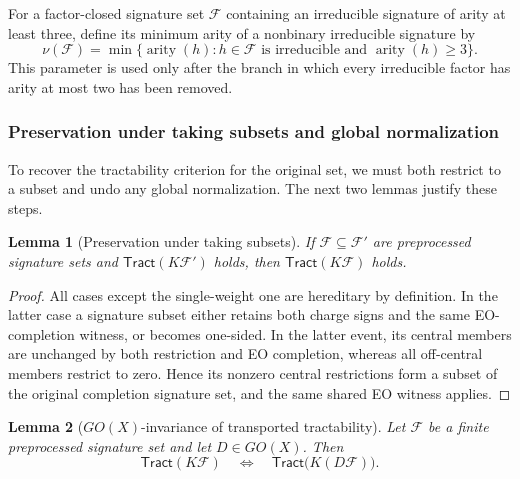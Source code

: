 \documentclass[11pt,letterpaper,onecolumn]{article}
\theoremstyle{plain}
\newtheorem{lemma}[lemma]{Lemma}
\theoremstyle{definition}
\theoremstyle{remark}
\newcommand{\cF}{\mathcal F}
\newcommand{\Tract}{\mathsf{Tract}}
\newcommand{\arity}{\operatorname{arity}}
\begin{document}
For a factor-closed signature set \(\cF\) containing an irreducible
signature of arity at least three, define its minimum arity of a nonbinary irreducible signature by
\begin{equation*}
 \nu(\cF)
 =\min\{\arity(h):h\in\cF
          \text{ is irreducible and }\arity(h)\ge3\}.
\end{equation*}
This parameter is used only after the branch in which every irreducible factor has
arity at most two has been removed.

\subsubsection{Preservation under taking subsets and global normalization}

To recover the tractability criterion for the original set, we must both
restrict to a subset and undo any global normalization. The next two
lemmas justify these steps.

\begin{lemma}[Preservation under taking subsets]
\label{lem:downward-inheritance}
If \(\cF\subseteq\cF'\) are preprocessed signature sets and
\(\Tract(K\cF')\) holds, then \(\Tract(K\cF)\) holds.
\end{lemma}

\begin{proof}
All cases except the single-weight one are hereditary by definition.
In the latter case a signature subset either retains both charge signs and the
same EO-completion witness, or becomes one-sided.  In the latter event, its
central members are unchanged by both restriction and EO completion, whereas
all off-central members restrict to zero.  Hence its nonzero central
restrictions form a subset of the original completion signature set, and the
same shared EO witness applies.
\end{proof}

\begin{lemma}[\(GO(X)\)-invariance of transported tractability]
\label{lem:GOX-tract-invariance}
Let \(\cF\) be a finite preprocessed signature set and let
\(D\in GO(X)\).  Then
\begin{equation*}
  \Tract(K\cF)
  \quad\Longleftrightarrow\quad
  \Tract\bigl(K(D\cF)\bigr).
\end{equation*}
\end{lemma}
\end{document}
